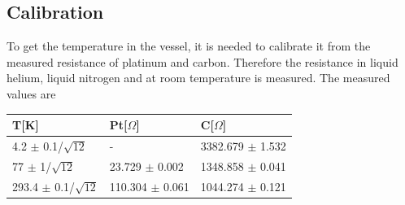 \documentclass{article}
\begin{document}
\subsection{Calibration}
To get the temperature in the vessel, it is needed to calibrate it from the measured resistance of platinum and carbon. 
Therefore the resistance in liquid helium, liquid nitrogen and at room temperature is measured.
The measured values are
    \begin{table}[H]
    \centering
        \begin{tabular}{l|l|l}
            T[K] & Pt[$\Omega$] & C[$\Omega$]\\\hline
            4.2 $\pm$ 0.1/$\sqrt{12}$ & - & 3382.679 $\pm$ 1.532 \\\hline
            77 $\pm$ 1/$\sqrt{12}$ & 23.729 $\pm$ 0.002 & 1348.858 $\pm$ 0.041 \\\hline
            293.4 $\pm$ 0.1/$\sqrt{12}$ & 110.304 $\pm$ 0.061 & 1044.274 $\pm$ 0.121  \\
        \end{tabular}
    \end{table}
\end{document}
